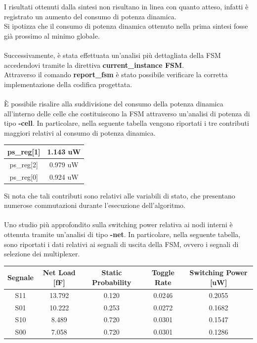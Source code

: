 \documentclass[11pt,  english, makeidx, a4paper, titlepage, oneside]{book}
\begin{document}
I risultati ottenuti dalla sintesi non risultano in linea con quanto atteso, infatti è registrato un aumento del consumo di potenza dinamica.
\\
Si ipotizza che il consumo di potenza dinamica ottenuto nella prima sintesi fosse già prossimo al minimo globale.
\\\\
Successivamente, è stata effettuata un'analisi più dettagliata della FSM accedendovi tramite la direttiva\textbf{ current\_instance FSM}.\\
Attraverso il comando \textbf{report\_fsm} è stato possibile verificare la corretta implementazione della codifica progettata.
\\\\
È possibile risalire alla suddivisione del consumo della potenza dinamica all'interno delle celle che costituiscono la FSM attraverso un'analisi di potenza di tipo \textbf{-cell}. In particolare, nella seguente tabella vengono riportati i tre contributi maggiori relativi al consumo di potenza dinamica.
\\
\begin{center}
	\begin{tabular}{|c|c|}
	\hline
	  ps\_reg[1] & 1.143 uW  \\
	\hline
	 ps\_reg[2] & 0.979 uW\\
	\hline
	ps\_reg[0] & 0.924 uW\\
	\hline
	\end{tabular}	
\end{center}
\vspace{0.3cm}
Si nota che tali contributi sono relativi alle variabili di stato, che presentano numerose commutazioni durante l'esecuzione dell'algoritmo.
\\\\
Uno studio più approfondito sulla switching power relativa ai nodi interni è ottenuta tramite un'analisi di tipo \textbf{-net}. In particolare, nella seguente tabella, sono riportati i dati relativi ai segnali di uscita della FSM, ovvero i segnali di selezione dei multiplexer.
\\
\begin{center}
	\begin{tabular}{|c|c|c|c|c|}
	\hline
	Segnale & Net Load [fF] & Static Probability & Toggle Rate & Switching Power [uW] \\
	\hline
	 S11 & 13.792  &  0.120  &  0.0246  & 0.2055 \\
	\hline
	 S01 & 10.222  &  0.253  &  0.0272  & 0.1682 \\
	\hline
	S10 & 8.489  &  0.720  &  0.0301  & 0.1547\\
	\hline
	S00 & 7.058  &  0.720  &  0.0301  & 0.1286 \\
	\hline
	\end{tabular}	
\end{center}
\end{document}
